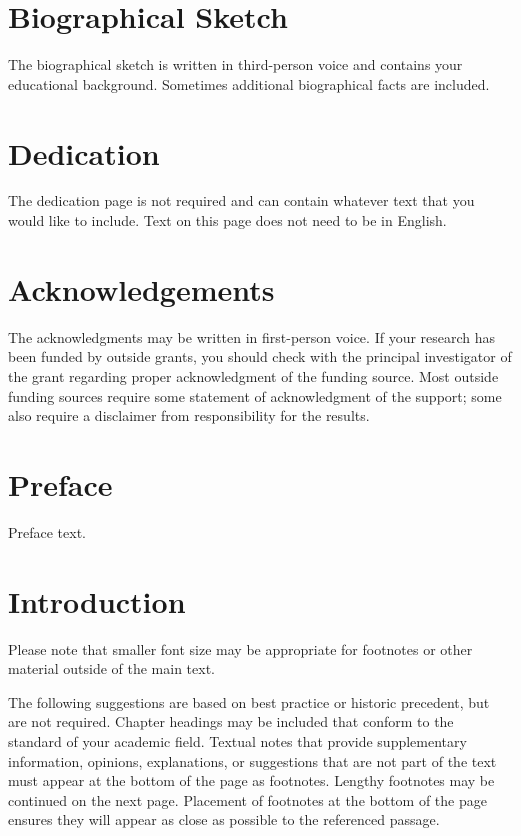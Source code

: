 \documentclass[letterpaper, 12pt, extrafontsizes, oneside]{memoir}
\begin{document}
\pagestyle{plain}
\restorepagenumber

\chapter{Biographical Sketch}
The biographical sketch is written in third-person voice and contains your educational background.
Sometimes additional biographical facts are included.
\clearpage

\chapter{Dedication}
The dedication page is not required and can contain whatever text that you would like to include.
Text on this page does not need to be in English.
\clearpage

\chapter{Acknowledgements}
The acknowledgments may be written in first-person voice.
If your research has been funded by outside grants, you should check with the principal investigator of the grant regarding proper acknowledgment of the funding source.
Most outside funding sources require some statement of acknowledgment of the support; some also require a disclaimer from responsibility for the results.
\cleardoublepage

\renewcommand*{\contentsname}{Table of Contents}
\tableofcontents
\clearpage

\listoffigures
\clearpage

\listoftables
\cleardoublepage

\chapter{Preface}
Preface text.
\cleardoublepage

\mainmatter

\chapter{Introduction}
Please note that smaller font size may be appropriate for footnotes or other material outside of the main text.

The following suggestions are based on best practice or historic precedent, but are not required.
Chapter headings may be included that conform to the standard of your academic field.
Textual notes that provide supplementary information, opinions, explanations, or suggestions that are not part of the text must appear at the bottom of the page as footnotes.
Lengthy footnotes may be continued on the next page.
Placement of footnotes at the bottom of the page ensures they will appear as close as possible to the referenced passage.
\end{document}
